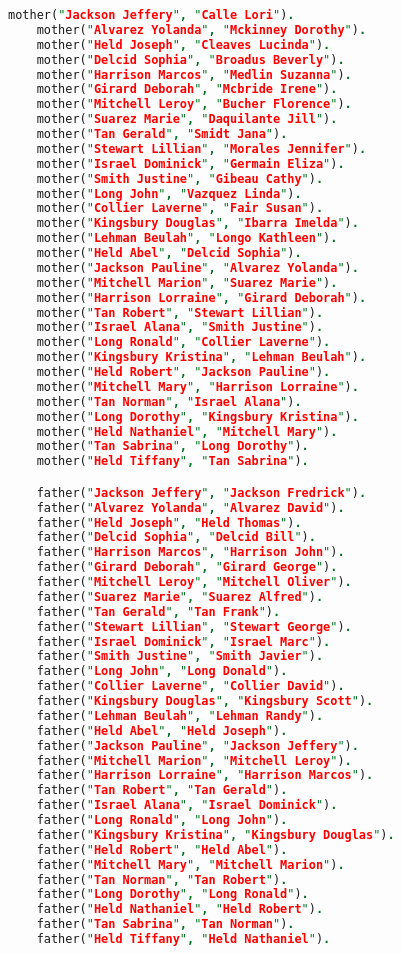 \begin{lstlisting}[language=Prolog]
    mother("Jackson Jeffery", "Calle Lori").
    mother("Alvarez Yolanda", "Mckinney Dorothy").
    mother("Held Joseph", "Cleaves Lucinda").
    mother("Delcid Sophia", "Broadus Beverly").
    mother("Harrison Marcos", "Medlin Suzanna").
    mother("Girard Deborah", "Mcbride Irene").
    mother("Mitchell Leroy", "Bucher Florence").
    mother("Suarez Marie", "Daquilante Jill").
    mother("Tan Gerald", "Smidt Jana").
    mother("Stewart Lillian", "Morales Jennifer").
    mother("Israel Dominick", "Germain Eliza").
    mother("Smith Justine", "Gibeau Cathy").
    mother("Long John", "Vazquez Linda").
    mother("Collier Laverne", "Fair Susan").
    mother("Kingsbury Douglas", "Ibarra Imelda").
    mother("Lehman Beulah", "Longo Kathleen").
    mother("Held Abel", "Delcid Sophia").
    mother("Jackson Pauline", "Alvarez Yolanda").
    mother("Mitchell Marion", "Suarez Marie").
    mother("Harrison Lorraine", "Girard Deborah").
    mother("Tan Robert", "Stewart Lillian").
    mother("Israel Alana", "Smith Justine").
    mother("Long Ronald", "Collier Laverne").
    mother("Kingsbury Kristina", "Lehman Beulah").
    mother("Held Robert", "Jackson Pauline").
    mother("Mitchell Mary", "Harrison Lorraine").
    mother("Tan Norman", "Israel Alana").
    mother("Long Dorothy", "Kingsbury Kristina").
    mother("Held Nathaniel", "Mitchell Mary").
    mother("Tan Sabrina", "Long Dorothy").
    mother("Held Tiffany", "Tan Sabrina").

    father("Jackson Jeffery", "Jackson Fredrick").
    father("Alvarez Yolanda", "Alvarez David").
    father("Held Joseph", "Held Thomas").
    father("Delcid Sophia", "Delcid Bill").
    father("Harrison Marcos", "Harrison John").
    father("Girard Deborah", "Girard George").
    father("Mitchell Leroy", "Mitchell Oliver").
    father("Suarez Marie", "Suarez Alfred").
    father("Tan Gerald", "Tan Frank").
    father("Stewart Lillian", "Stewart George").
    father("Israel Dominick", "Israel Marc").
    father("Smith Justine", "Smith Javier").
    father("Long John", "Long Donald").
    father("Collier Laverne", "Collier David").
    father("Kingsbury Douglas", "Kingsbury Scott").
    father("Lehman Beulah", "Lehman Randy").
    father("Held Abel", "Held Joseph").
    father("Jackson Pauline", "Jackson Jeffery").
    father("Mitchell Marion", "Mitchell Leroy").
    father("Harrison Lorraine", "Harrison Marcos").
    father("Tan Robert", "Tan Gerald").
    father("Israel Alana", "Israel Dominick").
    father("Long Ronald", "Long John").
    father("Kingsbury Kristina", "Kingsbury Douglas").
    father("Held Robert", "Held Abel").
    father("Mitchell Mary", "Mitchell Marion").
    father("Tan Norman", "Tan Robert").
    father("Long Dorothy", "Long Ronald").
    father("Held Nathaniel", "Held Robert").
    father("Tan Sabrina", "Tan Norman").
    father("Held Tiffany", "Held Nathaniel").


\end{lstlisting}
